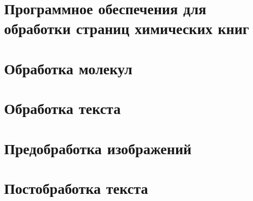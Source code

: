 \section{Программное обеспечения для обработки страниц химических книг}


\section{Обработка молекул}


\section{Обработка текста}


\section{Предобработка изображений}


\section{Постобработка текста}
